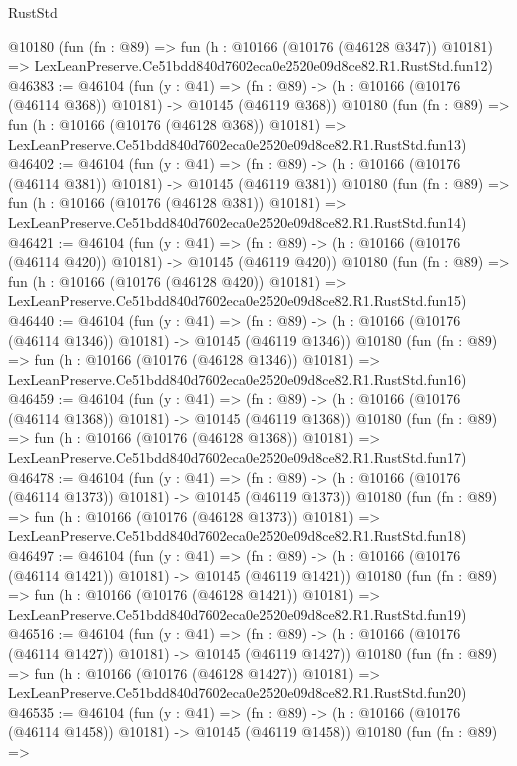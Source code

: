 \begin{lexlean}{RustStd}
\begin{coremodule}
    @10180
    (fun (fn : @89) =>
    fun (h : @10166 (@10176 (@46128 @347)) @10181) =>
    LexLeanPreserve.Ce51bdd840d7602eca0e2520e09d8ce82.R1.RustStd.fun12)
@46383 := @46104
    (fun (y : @41) =>
    (fn : @89) -> (h : @10166 (@10176 (@46114 @368)) @10181) -> @10145 (@46119 @368))
    @10180
    (fun (fn : @89) =>
    fun (h : @10166 (@10176 (@46128 @368)) @10181) =>
    LexLeanPreserve.Ce51bdd840d7602eca0e2520e09d8ce82.R1.RustStd.fun13)
@46402 := @46104
    (fun (y : @41) =>
    (fn : @89) -> (h : @10166 (@10176 (@46114 @381)) @10181) -> @10145 (@46119 @381))
    @10180
    (fun (fn : @89) =>
    fun (h : @10166 (@10176 (@46128 @381)) @10181) =>
    LexLeanPreserve.Ce51bdd840d7602eca0e2520e09d8ce82.R1.RustStd.fun14)
@46421 := @46104
    (fun (y : @41) =>
    (fn : @89) -> (h : @10166 (@10176 (@46114 @420)) @10181) -> @10145 (@46119 @420))
    @10180
    (fun (fn : @89) =>
    fun (h : @10166 (@10176 (@46128 @420)) @10181) =>
    LexLeanPreserve.Ce51bdd840d7602eca0e2520e09d8ce82.R1.RustStd.fun15)
@46440 := @46104
    (fun (y : @41) =>
    (fn : @89) -> (h : @10166 (@10176 (@46114 @1346)) @10181) -> @10145 (@46119 @1346))
    @10180
    (fun (fn : @89) =>
    fun (h : @10166 (@10176 (@46128 @1346)) @10181) =>
    LexLeanPreserve.Ce51bdd840d7602eca0e2520e09d8ce82.R1.RustStd.fun16)
@46459 := @46104
    (fun (y : @41) =>
    (fn : @89) -> (h : @10166 (@10176 (@46114 @1368)) @10181) -> @10145 (@46119 @1368))
    @10180
    (fun (fn : @89) =>
    fun (h : @10166 (@10176 (@46128 @1368)) @10181) =>
    LexLeanPreserve.Ce51bdd840d7602eca0e2520e09d8ce82.R1.RustStd.fun17)
@46478 := @46104
    (fun (y : @41) =>
    (fn : @89) -> (h : @10166 (@10176 (@46114 @1373)) @10181) -> @10145 (@46119 @1373))
    @10180
    (fun (fn : @89) =>
    fun (h : @10166 (@10176 (@46128 @1373)) @10181) =>
    LexLeanPreserve.Ce51bdd840d7602eca0e2520e09d8ce82.R1.RustStd.fun18)
@46497 := @46104
    (fun (y : @41) =>
    (fn : @89) -> (h : @10166 (@10176 (@46114 @1421)) @10181) -> @10145 (@46119 @1421))
    @10180
    (fun (fn : @89) =>
    fun (h : @10166 (@10176 (@46128 @1421)) @10181) =>
    LexLeanPreserve.Ce51bdd840d7602eca0e2520e09d8ce82.R1.RustStd.fun19)
@46516 := @46104
    (fun (y : @41) =>
    (fn : @89) -> (h : @10166 (@10176 (@46114 @1427)) @10181) -> @10145 (@46119 @1427))
    @10180
    (fun (fn : @89) =>
    fun (h : @10166 (@10176 (@46128 @1427)) @10181) =>
    LexLeanPreserve.Ce51bdd840d7602eca0e2520e09d8ce82.R1.RustStd.fun20)
@46535 := @46104
    (fun (y : @41) =>
    (fn : @89) -> (h : @10166 (@10176 (@46114 @1458)) @10181) -> @10145 (@46119 @1458))
    @10180
    (fun (fn : @89) =>

\end{coremodule}
\end{lexlean}
